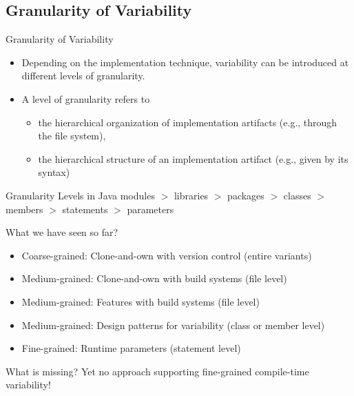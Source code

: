 
\subsection{Granularity of Variability}
\begin{frame}{\myframetitle}
	\begin{mycolumns}[animation=none]
		\begin{definition}{Granularity of Variability}
			\begin{itemize}
				\item Depending on the implementation technique, variability can be introduced at different levels of granularity.
				\item A level of granularity refers to
				\begin{itemize}
					\item the hierarchical organization of implementation artifacts (e.g., through the file system),
					\item the hierarchical structure of an implementation artifact (e.g., given by its syntax)
				\end{itemize}
			\end{itemize}
		\end{definition}
		\begin{example}{Granularity Levels in Java}
			modules $>$ libraries $>$ packages $>$ classes $>$ members $>$ statements $>$ parameters
		\end{example}
		\pause
	\mynextcolumn
		\begin{note}{What we have seen so far?}
			\begin{itemize}
				\item Coarse-grained: Clone-and-own with version control (entire variants)
				\item Medium-grained: Clone-and-own with build systems (file level)
				\item Medium-grained: Features with build systems (file level)
				\item Medium-grained: Design patterns for variability (class or member level)
				\item Fine-grained: Runtime parameters (statement level) 
			\end{itemize}
		\end{note}
		\pause
		\begin{note}{What is missing?}
			Yet no approach supporting fine-grained compile-time variability!
		\end{note}		
	\end{mycolumns}
\end{frame}

